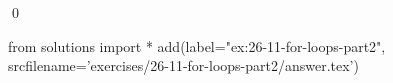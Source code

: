 
\begin{ex}
  \label{ex:26-11-for-loops-part2}
  
  \qed
\end{ex}
\begin{python0}
from solutions import *
add(label="ex:26-11-for-loops-part2",
    srcfilename='exercises/26-11-for-loops-part2/answer.tex')
\end{python0}
